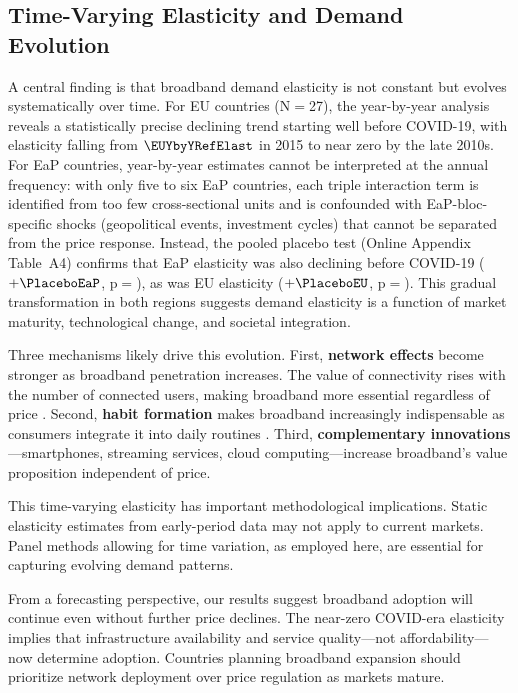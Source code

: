 \subsection{Time-Varying Elasticity and Demand Evolution}

A central finding is that broadband demand elasticity is not constant but evolves systematically over time. For EU countries (N$=$27), the year-by-year analysis reveals a statistically precise declining trend starting well before COVID-19, with elasticity falling from $\EUYbyYRefElast$ in 2015 to near zero by the late 2010s. For EaP countries, year-by-year estimates cannot be interpreted at the annual frequency: with only five to six EaP countries, each triple interaction term is identified from too few cross-sectional units and is confounded with EaP-bloc-specific shocks (geopolitical events, investment cycles) that cannot be separated from the price response. Instead, the pooled placebo test (Online Appendix Table~A4) confirms that EaP elasticity was also declining before COVID-19 ($+\PlaceboEaP$, p$=$\PlaceboEaPPval), as was EU elasticity ($+\PlaceboEU$, p$=$\PlaceboEUPval). This gradual transformation in both regions suggests demand elasticity is a function of market maturity, technological change, and societal integration.

Three mechanisms likely drive this evolution. First, \textbf{network effects} become stronger as broadband penetration increases. The value of connectivity rises with the number of connected users, making broadband more essential regardless of price \citep{katz1985network}. Second, \textbf{habit formation} makes broadband increasingly indispensable as consumers integrate it into daily routines \citep{becker1988theory}. Third, \textbf{complementary innovations}---smartphones, streaming services, cloud computing---increase broadband's value proposition independent of price.

This time-varying elasticity has important methodological implications. Static elasticity estimates from early-period data may not apply to current markets. Panel methods allowing for time variation, as employed here, are essential for capturing evolving demand patterns.

From a forecasting perspective, our results suggest broadband adoption will continue even without further price declines. The near-zero COVID-era elasticity implies that infrastructure availability and service quality---not affordability---now determine adoption. Countries planning broadband expansion should prioritize network deployment over price regulation as markets mature.

